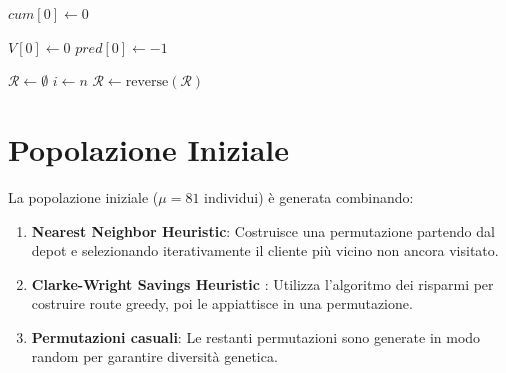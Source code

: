 \begin{algorithm}[H]
\footnotesize
\caption{Split Algorithm (Prins, 2004)}
\label{alg:split}

$\mathit{cum}[0] \gets 0$\;

$V[0] \gets 0$\;
$\mathit{pred}[0] \gets -1$\;

$\mathcal{R} \gets \emptyset$\;
$i \gets n$\;
$\mathcal{R} \gets \text{reverse}(\mathcal{R})$\;  
\;
\end{algorithm}

\section{Popolazione Iniziale}

La popolazione iniziale ($\mu = 81$ individui) \`e generata combinando:
\begin{enumerate}[label=\textbf{\arabic*.}]
    \item \textbf{Nearest Neighbor Heuristic}: Costruisce una permutazione partendo
          dal depot e selezionando iterativamente il cliente pi\`u vicino non ancora
          visitato.
    \item \textbf{Clarke-Wright Savings Heuristic} \cite{clarke1964scheduling}: Utilizza l'algoritmo dei risparmi
          per costruire route greedy, poi le appiattisce in una permutazione.
    \item \textbf{Permutazioni casuali}: Le restanti permutazioni sono generate in modo
          random per garantire diversit\`a genetica.
\end{enumerate}

